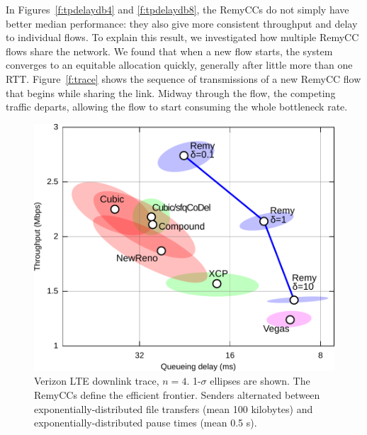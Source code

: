 In Figures~\ref{f:tpdelaydb4} and \ref{f:tpdelaydb8}, the RemyCCs do
not simply have better median performance: they also give more
consistent throughput and delay to individual flows. To explain this
result, we investigated how multiple RemyCC flows share the
network. We found that when a new flow starts, the system converges to
an equitable allocation quickly, generally after little more than one
RTT. Figure~\ref{f:trace} shows the sequence of transmissions of a new
RemyCC flow that begins while sharing the link.  Midway through the
flow, the competing traffic departs, allowing the flow to start
consuming the whole bottleneck rate.

\begin{figure}
\includegraphics[width=\columnwidth]{vzw-4-final.pdf}
\caption{Verizon LTE downlink trace, $n = 4$. 1-$\sigma$ ellipses are shown.
The RemyCCs define the efficient frontier. Senders alternated between
exponentially-distributed file transfers (mean 100 kilobytes) and
exponentially-distributed pause times (mean 0.5 s).}
\label{f:verizon4}

\end{figure}

